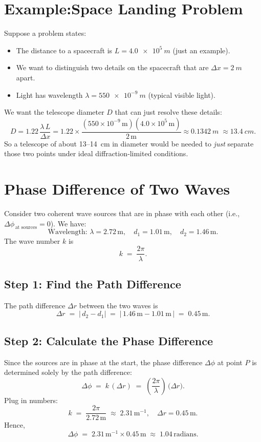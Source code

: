 \documentclass[12pt]{article}
\theoremstyle{definition} %
\theoremstyle{plain} %
\begin{document}
\section*{Example:\;Space Landing Problem}
Suppose a problem states:
\begin{itemize}
  \item The distance to a spacecraft is $L = \SI{4.0e5}{m}$ (just an example).
  \item We want to distinguish two details on the spacecraft that are $\Delta x = \SI{2}{m}$ apart.
  \item Light has wavelength $\lambda = \SI{550e-9}{m}$ (typical visible light).
\end{itemize}
We want the telescope diameter $D$ that can just resolve these details:
\[
  D = 1.22\,\frac{\lambda\,L}{\Delta x}
    = 1.22 \times \frac{(550\times10^{-9}\,\mathrm{m})(4.0\times10^5\,\mathrm{m})}%
                     {2\,\mathrm{m}}
    \approx \SI{0.1342}{m} \;\approx \SI{13.4}{cm}.
\]
So a telescope of about 13--14~cm in diameter would be needed to \emph{just} 
separate those two points under ideal diffraction‐limited conditions.


\section*{Phase Difference of Two Waves}

Consider two coherent wave sources that are in phase with each other 
(i.e., $\Delta \phi_{\,\text{at sources}} = 0$).  
We have:
\[
  \text{Wavelength: } \lambda = 2.72\,\mathrm{m}, 
  \quad
  d_1 = 1.01\,\mathrm{m}, 
  \quad
  d_2 = 1.46\,\mathrm{m}.
\]
The wave number $k$ is
\[
  k \;=\; \frac{2\pi}{\lambda}.
\]

\subsection*{Step 1: Find the Path Difference}
The path difference $\Delta r$ between the two waves is
\[
  \Delta r \;=\; \bigl|\,d_2 - d_1\bigr|
              \;=\; |\,1.46\,\mathrm{m} - 1.01\,\mathrm{m}\,|
              \;=\; 0.45\,\mathrm{m}.
\]

\subsection*{Step 2: Calculate the Phase Difference}
Since the sources are in phase at the start, 
the phase difference $\Delta \phi$ at point $P$ is determined solely by 
the path difference:
\[
  \Delta \phi 
  \;=\; k\,(\Delta r)
  \;=\; \left(\frac{2\pi}{\lambda}\right)\,\bigl(\Delta r\bigr).
\]
Plug in numbers:
\[
  k
  \;=\; \frac{2\pi}{2.72\,\mathrm{m}}
  \;\approx\; 2.31\,\mathrm{m}^{-1},
  \quad
  \Delta r = 0.45\,\mathrm{m}.
\]
Hence,
\[
  \Delta \phi 
  \;=\; 2.31\,\mathrm{m}^{-1} \times 0.45\,\mathrm{m}
  \;\approx\; 1.04\,\mathrm{radians}.
\]
\end{document}
